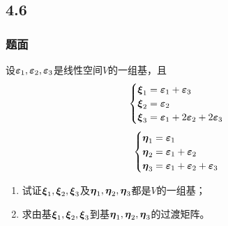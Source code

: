 \documentclass{beamer}
\begin{document}
\subsection*{4.6}
\begin{frame}
    \frametitle{题面}
    设\(\boldsymbol{\varepsilon}_1,\boldsymbol{\varepsilon}_2,\boldsymbol{\varepsilon}_3\)是线性空间\(V\)的一组基，且
    \begin{equation*}
        \begin{cases}
            \boldsymbol{\xi}_1=\boldsymbol{\varepsilon}_1+\boldsymbol{\varepsilon}_3 \\
            \boldsymbol{\xi}_2=\boldsymbol{\varepsilon}_2            \\
            \boldsymbol{\xi}_3=\boldsymbol{\varepsilon}_1+2\boldsymbol{\varepsilon}_2+2\boldsymbol{\varepsilon}_3
        \end{cases}
    \end{equation*}
    \begin{equation*}
        \begin{cases}
            \boldsymbol{\eta}_1=\boldsymbol{\varepsilon}_1            \\
            \boldsymbol{\eta}_2=\boldsymbol{\varepsilon}_1+\boldsymbol{\varepsilon}_2 \\
            \boldsymbol{\eta}_3=\boldsymbol{\varepsilon}_1+\boldsymbol{\varepsilon}_2+\boldsymbol{\varepsilon}_3
        \end{cases}
    \end{equation*}
    \begin{enumerate}
        \item 试证\(\boldsymbol{\xi}_1,\boldsymbol{\xi}_2,\boldsymbol{\xi}_3\)及\(\boldsymbol{\eta}_1,\boldsymbol{\eta}_2,\boldsymbol{\eta}_3\)都是\(V\)的一组基；
        \item 求由基\(\boldsymbol{\xi}_1,\boldsymbol{\xi}_2,\boldsymbol{\xi}_3\)到基\(\boldsymbol{\eta}_1,\boldsymbol{\eta}_2,\boldsymbol{\eta}_3\)的过渡矩阵。
    \end{enumerate}
\end{frame}
\end{document}
